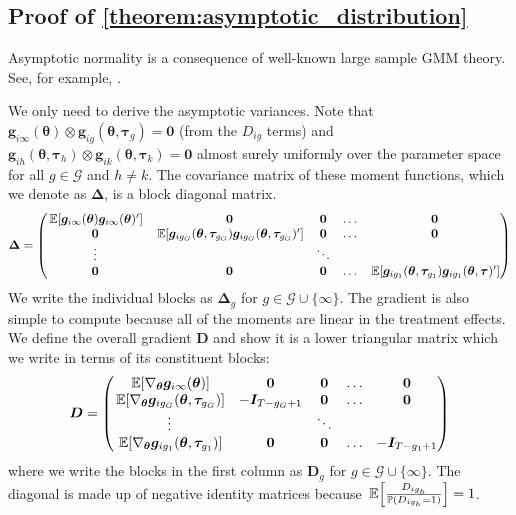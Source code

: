 \documentclass[12pt]{article}
\begin{document}
\subsection*{Proof of \autoref{theorem:asymptotic_distribution}}

Asymptotic normality is a consequence of well-known large sample GMM theory. See, for example, \citet{Hansen_1982}.

We only need to derive the asymptotic variances. Note that $\bm g_{i\infty}(\bm \theta) \otimes \bm g_{ig}(\bm \theta, \bm \tau_g) = \bm 0$ (from the $D_{ig}$ terms) and $\bm g_{ih}(\bm \theta, \bm \tau_h) \otimes \bm g_{ik}(\bm \theta, \bm \tau_k) = \bm 0$ almost surely uniformly over the parameter space for all $g \in \mathcal{G}$ and $h \neq k$. The covariance matrix of these moment functions, which we denote as $\bm \Delta$, is a block diagonal matrix.
\begin{equation*}
    \bm \Delta =
    \begin{pmatrix}
        \expec{\bm g_{i \infty}(\bm \theta) \bm g_{i \infty}(\bm \theta)'} & \bm 0 & \bm 0 & \hdots & \bm 0\\
        \bm 0 &  \expec{\bm g_{i g_G}(\bm \theta, \bm \tau_{g_G}) \bm g_{i g_G}(\bm \theta, \bm \tau_{g_G})' } & \bm 0 & \hdots & \bm 0\\
        \vdots & & \ddots  &\\
        \bm 0 & \bm 0 & \bm 0 & \hdots & \expec{ \bm g_{i g_1}(\bm \theta, \bm \tau_{g_1}) \bm g_{i g_1}(\bm \theta, \bm \tau)'}
    \end{pmatrix}
\end{equation*}
We write the individual blocks as $\bm \Delta_g$ for $g \in \mathcal{G} \cup \{ \infty \}$. The gradient is also simple to compute because all of the moments are linear in the treatment effects. We define the overall gradient $\bm D$ and show it is a lower triangular matrix which we write in terms of its constituent blocks:
\begin{equation*}
    \bm D = 
    \begin{pmatrix}
        \expec{\nabla_{\bm \theta} \bm g_{i\infty}(\bm \theta) } & \bm 0 & \bm 0 & \hdots & \bm 0\\
        \expec{\nabla_{\bm \theta} \bm g_{ig_G}(\bm \theta, \bm \tau_{g_G})} & -\bm I_{T - g_G + 1} & \bm 0 & \hdots & \bm 0\\
        \vdots & & \ddots  &\\
        \expec{\nabla_{\bm \theta} \bm g_{ig_1}(\bm \theta, \bm \tau_{g_1})} & \bm 0 & \bm 0 & \hdots & -\bm I_{T - g_1 + 1}
    \end{pmatrix}
\end{equation*}
where we write the blocks in the first column as $\bm D_g$ for $g \in \mathcal{G} \cup \{ \infty \}$. The diagonal is made up of negative identity matrices because $\expec{\frac{D_{ig_h}}{\mathbb{P}(D_{ig_h} = 1)}} = 1$.
\end{document}
